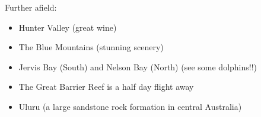 Further afield:
\begin{itemize}
 \item Hunter Valley (great wine)
\item The Blue Mountains (stunning scenery)
\item Jervis Bay (South) and Nelson Bay (North) (see some dolphins!!)
\item The Great Barrier Reef is a half day flight away
\item Uluru (a large sandstone rock formation in central Australia) 
\end{itemize}

% 
% 
% 
% 
% 
